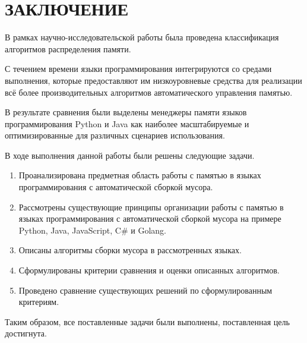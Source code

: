 \part*{ЗАКЛЮЧЕНИЕ}

В рамках научно-исследовательской работы была проведена классификация алгоритмов распределения памяти.

С течением времени языки программирования интегрируются со средами выполнения, которые предоставляют им низкоуровневые средства для реализации всё более производительных алгоритмов автоматического управления памятью.

В результате сравнения были выделены менеджеры памяти языков программирования Python и Java как наиболее масштабируемые и оптимизированные для различных сценариев использования.

В ходе выполнения данной работы были решены следующие задачи.

\begin{enumerate}[label*=\arabic*.]
	\item Проанализирована предметная область работы с памятью в языках программирования с автоматической сборкой мусора.
	\item Рассмотрены существующие принципы организации работы с памятью в языках программирования с автоматической сборкой мусора на примере Python, Java, JavaScript, C\# и Golang.
	\item Описаны алгоритмы сборки мусора в рассмотренных языках.
	\item Сформулированы критерии сравнения и оценки описанных алгоритмов.
	\item Проведено сравнение существующих решений по сформулированным критериям. 
\end{enumerate}

Таким образом, все поставленные задачи были выполнены, поставленная цель достигнута.

